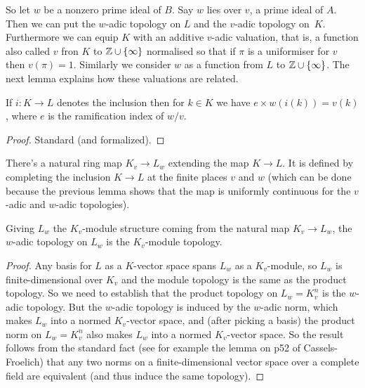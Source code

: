 So let $w$ be a nonzero prime ideal of $B$. Say $w$ lies over $v$, a prime ideal of $A$.
Then we can put the $w$-adic topology on $L$ and the $v$-adic topology on~$K$. Furthermore
we can equip $K$ with an additive $v$-adic valuation, that is,
a function also called $v$ fron $K$ to $\mathbb{Z}\cup\{\infty\}$ normalised so that if $\pi$ is a uniformiser
for $v$ then $v(\pi)=1$. Similarly we consider $w$ as a function from $L$ to $\mathbb{Z}\cup\{\infty\}$.
The next lemma explains how these valuations are related.

\begin{lemma} If $i:K\to L$ denotes the inclusion then for $k\in K$ we have
  $e\times w(i(k))=v(k)$, where $e$ is the ramification index of $w/v$.
  \label{IsDedekindDomain.HeightOneSpectrum.valuation_comap}
  \leanok
\end{lemma}
\begin{proof}
  \leanok
  Standard (and formalized).
\end{proof}

\begin{definition}
  \label{IsDedekindDomain.HeightOneSpectrum.adicCompletionComapSemialgHom}
  \leanok
  There's a natural ring map $K_v\to L_w$ extending the map $K\to L$.
  It is defined by completing
  the inclusion $K\to L$ at the finite places $v$ and $w$ (which can be done
  because the previous lemma shows that the map is uniformly continuous for the $v$-adic
  and $w$-adic topologies).
\end{definition}

\begin{theorem}
  \label{IsDedekindDomain.HeightOneSpectrum.adicCompletionComap_isModuleTopology}
  \leanok
  Giving $L_w$ the $K_v$-module structure coming from the natural map $K_v\to L_w$,
  the $w$-adic topology on $L_w$ is the $K_v$-module topology.
\end{theorem}
\begin{proof}
  Any basis for $L$ as a $K$-vector space spans $L_w$ as a $K_v$-module, so $L_w$ is
  finite-dimensional over $K_v$ and the module topology is the same as the product
  topology. So we need to establish that the product topology on $L_w=K_v^n$ is
  the $w$-adic topology. But the $w$-adic topology is induced by the $w$-adic norm,
  which makes $L_w$ into a normed $K_v$-vector space, and (after picking a basis)
  the product norm on $L_w=K_v^n$ also makes $L_w$ into a normed $K_v$-vector space.
  So the result follows from the standard fact (see for example the lemma on p52
  of Cassels-Froelich) that any two norms on a finite-dimensional vector space over
  a complete field are equivalent (and thus induce the same topology).
\end{proof}

